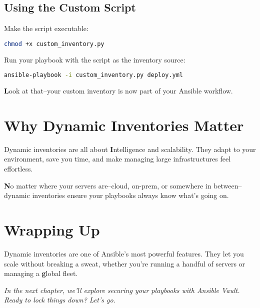 \subsection{Using the Custom Script}

Make the script executable:
\begin{lstlisting}[language=bash, caption=Making the Script Executable]
chmod +x custom_inventory.py
\end{lstlisting}

Run your playbook with the script as the inventory source:
\begin{lstlisting}[language=bash, caption=Using a Custom Inventory Script]
ansible-playbook -i custom_inventory.py deploy.yml
\end{lstlisting}

\textbf{L}ook at that--your custom inventory is now part of your Ansible workflow.


\section{Why Dynamic Inventories Matter}

Dynamic inventories are all about \textbf{I}ntelligence and scalability. They adapt to your environment, save you time, and make managing large infrastructures feel effortless.

\textbf{N}o matter where your servers are--cloud, on-prem, or somewhere in between--dynamic inventories ensure your playbooks always know what's going on.


\section{Wrapping Up}

Dynamic inventories are one of Ansible's most powerful features. They let you scale without breaking a sweat, whether you're running a handful of servers or managing a \textbf{g}lobal fleet.

\vspace{1em}

\textit{In the next chapter, we'll explore securing your playbooks with Ansible Vault. Ready to lock things down? Let's go.}

